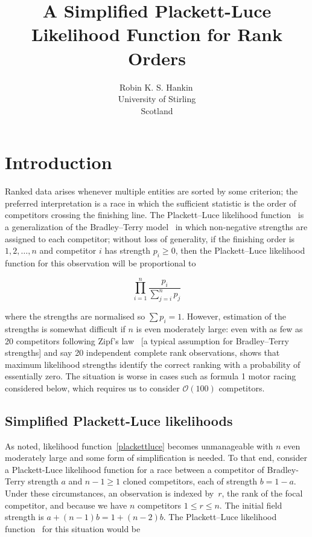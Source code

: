 \documentclass[article]{ajs}
\author{Robin K. S. Hankin\,\orcidlink{0000-0001-5982-0415}\\
  University of Stirling\\ Scotland}
\title{A Simplified Plackett-Luce Likelihood Function for Rank Orders}
\begin{document}

\section{Introduction}

Ranked data arises whenever multiple entities are sorted by some
criterion; the preferred interpretation is a race in which the
sufficient statistic is the order of competitors crossing the
finishing line.  The Plackett--Luce likelihood
function~\citep{luce1959,plackett1975} is a generalization of the
Bradley--Terry model~\citep{bradley1952} in which non-negative
strengths are assigned to each competitor; without loss of generality,
if the finishing order is $1,2,\ldots,n$ and competitor $i$ has
strength $p_i\geqslant 0$, then the Plackett--Luce likelihood function
for this observation will be proportional to

\begin{equation}\label{plackettluce}
\prod_{i=1}^n\frac{p_i}{\sum_{j=i}^np_j}
\end{equation}

\noindent where the strengths are normalised so $\sum p_i=1$.
However, estimation of the strengths is somewhat difficult if $n$ is
even moderately large: even with as few as 20 competitors following
Zipf's law~\citep{zipf1949} [a typical assumption for Bradley--Terry
  strengths] and say 20 independent complete rank observations,
\cite{hankin2017_rmd} shows that maximum likelihood strengths
identify the correct ranking with a probability of essentially zero.
The situation is worse in cases such as formula 1 motor racing
considered below, which requires us to consider ${\mathcal O}(100)$
competitors.

\subsection{Simplified Plackett-Luce likelihoods}

As noted, likelihood function~\ref{plackettluce} becomes unmanageable
with $n$ even moderately large and some form of simplification is
needed.  To that end, consider a Plackett-Luce likelihood function for
a race between a competitor of Bradley-Terry strength $a$ and
$n-1\geqslant 1$ cloned competitors, each of strength $b=1-a$.  Under
these circumstances, an observation is indexed by~$r$, the rank of the
focal competitor, and because we have $n$ competitors $1\leqslant
r\leqslant n$.  The initial field strength is $a+(n-1)b=1+(n-2)b$.  The
Plackett--Luce likelihood function~\citep{luce1959,plackett1975} for
this situation would be
\end{document}
